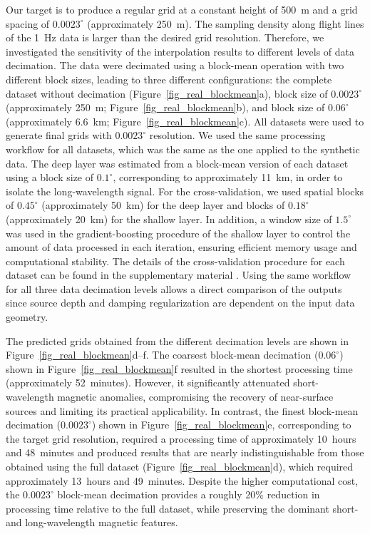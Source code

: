 \documentclass[a4paper,oneside,10pt]{book}
\begin{document}
Our target is to produce a regular grid at a constant height of 500~m and
a grid spacing of $0.0023^{\circ}$ (approximately 250~m).
The sampling density along flight lines of the 1~Hz data is larger than the
desired grid resolution.
Therefore, we investigated the sensitivity of the interpolation results to
different levels of data decimation.
The data were decimated using a block-mean operation with
two different block sizes, leading to three different configurations:
the complete dataset without decimation (Figure~\ref{fig_real_blockmean}a),
block size of $0.0023^{\circ}$ (approximately 250~m;
Figure~\ref{fig_real_blockmean}b), and
block size of $0.06^{\circ}$ (approximately 6.6~km; Figure~\ref{fig_real_blockmean}c). All
datasets were used to generate final grids with $0.0023^{\circ}$ resolution.
We used the same processing workflow for all datasets, which was the same as
the one applied to the synthetic data.
The deep layer was estimated from a block-mean version of each
dataset using a block size of $0.1^{\circ}$, corresponding to approximately
11~km, in order to isolate the long-wavelength signal.
For the cross-validation, we used
spatial blocks of $0.45^{\circ}$ (approximately 50~km) for the deep layer
and blocks of $0.18^{\circ}$ (approximately 20~km) for the shallow layer.
In addition, a window size of $1.5^{\circ}$ was used in the
gradient-boosting procedure of the shallow layer to control the amount of data
processed in each iteration, ensuring efficient memory usage and computational
stability.
The details of the cross-validation procedure for each dataset can be found in
the supplementary material \citep{archive}.
Using the same workflow for all three data decimation levels allows a direct
comparison of the outputs since source depth and damping regularization are
dependent on the input data geometry.

The predicted grids obtained from the different decimation
levels are shown in Figure~\ref{fig_real_blockmean}d--f.
The coarsest block-mean decimation ($0.06^{\circ}$) shown in
Figure~\ref{fig_real_blockmean}f resulted in the shortest
processing time (approximately 52~minutes).
However, it significantly attenuated short-wavelength magnetic anomalies,
compromising the recovery of near-surface sources and limiting its practical
applicability.
In contrast, the finest block-mean decimation ($0.0023^{\circ}$) shown in
Figure~\ref{fig_real_blockmean}e, corresponding to the target grid resolution,
required a processing time of approximately 10~hours and 48~minutes and
produced results that are nearly indistinguishable from those obtained using
the full dataset (Figure~\ref{fig_real_blockmean}d), which required
approximately 13~hours and 49~minutes.
Despite the higher computational cost, the $0.0023^{\circ}$ block-mean
decimation provides a roughly 20\% reduction in processing time relative to the
full dataset, while preserving the dominant short- and long-wavelength magnetic
features.
\end{document}
